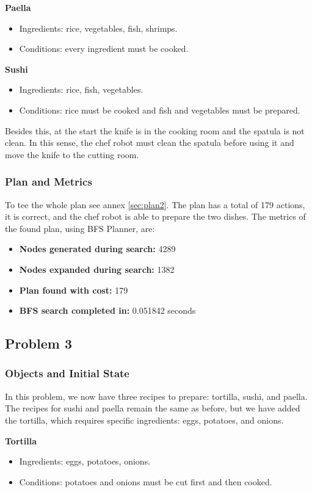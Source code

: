 \documentclass[a4paper,12pt]{article}
\begin{document}
 \textbf{Paella}
\begin{itemize}
    \item Ingredients: rice, vegetables, fish, shrimps.
    \item Conditions: every ingredient must be cooked.
\end{itemize}

\textbf{Sushi}
\begin{itemize}
    \item Ingredients: rice, fish, vegetables.
    \item Conditions: rice must be cooked and fish and vegetables must be prepared.
\end{itemize}

Besides this, at the start the knife is in the cooking room and the spatula is not clean. In this sense, the chef robot must clean the spatula before using it and move the knife to the cutting room.
\subsubsection{Plan and Metrics}
To tee the whole plan see annex \ref{sec:plan2}. The plan has a total of 179 actions, it is correct, and the chef robot is able to prepare the two dishes. The metrics of the found plan, using BFS Planner, are:

\begin{itemize}
    \item \textbf{Nodes generated during search:} 4289
    \item \textbf{Nodes expanded during search:} 1382
    \item \textbf{Plan found with cost:} 179
    \item \textbf{BFS search completed in:} 0.051842 seconds
\end{itemize}

\subsection{Problem 3}
\subsubsection{Objects and Initial State}
In this problem, we now have three recipes to prepare: tortilla, sushi, and paella. The recipes for sushi and paella remain the same as before, but we have added the tortilla, which requires specific ingredients: eggs, potatoes, and onions.


\textbf{Tortilla}
\begin{itemize}
    \item Ingredients: eggs, potatoes, onions.
    \item Conditions: potatoes and onions must be cut first and then cooked.
\end{itemize}
\end{document}
